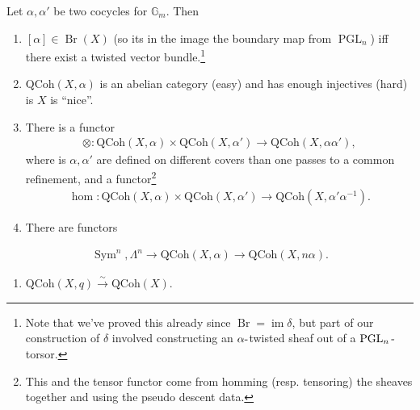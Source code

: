 \begin{proposition}[?]

Let \(\alpha, \alpha'\) be two cocycles for \({\mathbb{G}}_{m}\). Then

\begin{enumerate}
\def\labelenumi{\arabic{enumi}.}
\item
  \([\alpha]\in\operatorname{Br}(X)\) (so its in the image the boundary
  map from \(\operatorname{PGL}_{n}\)) iff there exist a twisted vector
  bundle.\footnote{Note that we've proved this already since
    \(\operatorname{Br}= \operatorname{im}\delta\), but part of our
    construction of \(\delta\) involved constructing an
    \(\alpha{\hbox{-}}\)twisted sheaf out of a
    \(\operatorname{PGL}_{n}{\hbox{-}}\)torsor.}
\item
  \({\mathrm{QCoh}}(X,\alpha)\) is an abelian category (easy) and has
  enough injectives (hard) is \(X\) is ``nice''.
\item
  There is a functor
  \begin{align*}  
  \otimes: {\mathrm{QCoh}}(X, \alpha) \times{\mathrm{QCoh}}(X, \alpha') \xrightarrow{} {\mathrm{QCoh}}(X, \alpha \alpha')
  ,\end{align*}
  where is \(\alpha,\alpha'\) are defined on different covers than one
  passes to a common refinement, and a functor\footnote{This and the
    tensor functor come from homming (resp. tensoring) the sheaves
    together and using the pseudo descent data.}
  \begin{align*}  
  \hom: {\mathrm{QCoh}}(X, \alpha) \times{\mathrm{QCoh}}(X, \alpha') \xrightarrow{} 
  {\mathrm{QCoh}}(X, \alpha' \alpha^{-1})
  .\end{align*}
\item
  There are functors
\end{enumerate}

\begin{align*}  
\operatorname{Sym}^{n}, \Lambda^{n} \xrightarrow{} {\mathrm{QCoh}}(X, \alpha) \xrightarrow{} {\mathrm{QCoh}}(X, n \alpha)
.\end{align*}

\begin{enumerate}
\def\labelenumi{\arabic{enumi}.}
\setcounter{enumi}{4}
\tightlist
\item
  \({\mathrm{QCoh}}(X, q) \xrightarrow{\sim}{\mathrm{QCoh}}(X)\).
\end{enumerate}

\end{proposition}

